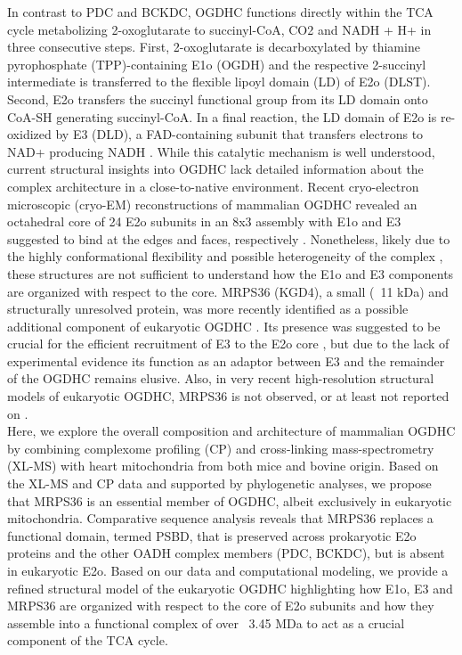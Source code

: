 In contrast to PDC and BCKDC, OGDHC functions directly within the TCA cycle metabolizing 2-oxoglutarate to succinyl-CoA, CO2 and NADH + H+ in three consecutive steps. First, 2-oxoglutarate is decarboxylated by thiamine pyrophosphate (TPP)-containing E1o (OGDH) and the respective 2-succinyl intermediate is transferred to the flexible lipoyl domain (LD) of E2o (DLST). Second, E2o transfers the succinyl functional group from its LD domain onto CoA-SH generating succinyl-CoA. In a final reaction, the LD domain of E2o is re-oxidized by E3 (DLD), a FAD-containing subunit that transfers electrons to NAD+ producing NADH \cite{Kyrilis_2021,Qi_2011}. While this catalytic mechanism is well understood, current structural insights into OGDHC lack detailed information about the complex architecture \cite{Frank_2007,Knapp_1998,Ricaud_1996,Robien_1992} in a close-to-native environment. Recent cryo-electron microscopic (cryo-EM) reconstructions of mammalian OGDHC revealed an octahedral core of 24 E2o subunits in an 8x3 assembly with E1o and E3 suggested to bind at the edges and faces, respectively \cite{Liu_2022,Nagy_2021}. Nonetheless, likely due to the highly conformational flexibility and possible heterogeneity of the complex \cite{Lengyel_2008}, these structures are not sufficient to understand how the E1o and E3 components are organized with respect to the core. MRPS36 (KGD4), a small (~11 kDa) and structurally unresolved protein, was more recently identified as a possible additional component of eukaryotic OGDHC \cite{Chatzispyrou_2018,Guerrero-Castillo_2021,Heublein_2014}. Its presence was suggested to be crucial for the efficient recruitment of E3 to the E2o core \cite{Heublein_2014}, but due to the lack of experimental evidence its function as an adaptor between E3 and the remainder of the OGDHC remains elusive. Also, in very recent high-resolution structural models of eukaryotic OGDHC, MRPS36 is not observed, or at least not reported on \cite{Liu_2022,Nagy_2021}.\\
Here, we explore the overall composition and architecture of mammalian OGDHC by combining complexome profiling (CP) \cite{Cabrera-Orefice_2021,Hevler_2021a} and cross-linking mass-spectrometry (XL-MS) with heart mitochondria from both mice and bovine origin. Based on the XL-MS and CP data and supported by phylogenetic analyses, we propose that MRPS36 is an essential member of OGDHC, albeit exclusively in eukaryotic mitochondria. Comparative sequence analysis reveals that MRPS36 replaces a functional domain, termed PSBD, that is preserved across prokaryotic E2o proteins and the other OADH complex members (PDC, BCKDC), but is absent in eukaryotic E2o. Based on our data and computational modeling, we provide a refined structural model of the eukaryotic OGDHC highlighting how E1o, E3 and MRPS36 are organized with respect to the core of E2o subunits and how they assemble into a functional complex of over ~3.45 MDa to act as a crucial component of the TCA cycle.

